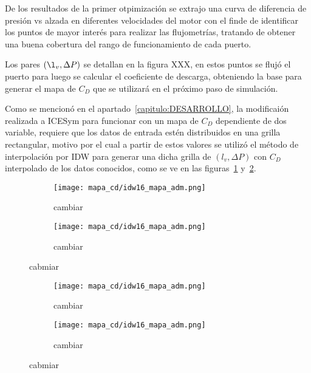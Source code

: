 De los resultados de la primer otpimización se extrajo una curva de diferencia
de presión vs alzada en diferentes velocidades del motor con el finde de
identificar los puntos de mayor interés para realizar las flujometrías,
tratando de obtener una buena cobertura del rango de funcionamiento de cada
puerto.


Los pares $(\l_{v}, \Delta P)$ se detallan en la figura XXX, en estos puntos se
flujó el puerto para luego se calcular el coeficiente de descarga, obteniendo
la base para generar el mapa de $C_D$ que se utilizará en el próximo paso de
simulación.

Como se mencionó en el apartado~\ref{capitulo:DESARROLLO}, la modificaión
realizada a ICESym para funcionar con un mapa de $C_{D}$ dependiente de dos
variable, requiere que los datos de entrada estén distribuidos en una grilla
rectangular, motivo por el cual a partir de estos valores se utilizó el método
de interpolación por IDW para generar una dicha grilla de $(l_{v}, \Delta P)$
con $C_{D}$ interpolado de los datos conocidos, como se ve en las
figuras~\ref{fig:mapa_cd_admision} y~\ref{fig:mapa_cd_escape}.

\begin{figure}
    \centering
    \begin{subfigure}{0.4\textwidth}
        \centering
        \texttt{[image: mapa\_cd/idw16\_mapa\_adm.png]}
        \caption{cambiar}
    \end{subfigure}
    \hfill
    \begin{subfigure}{0.4\textwidth}
        \centering
        \texttt{[image: mapa\_cd/idw16\_mapa\_adm.png]}
        \caption{cambiar}
    \end{subfigure}
    \caption{cabmiar}\label{fig:mapa_cd_admision}
\end{figure}

\begin{figure}
    \centering
    \begin{subfigure}{0.4\textwidth}
        \centering
        \texttt{[image: mapa\_cd/idw16\_mapa\_adm.png]}
        \caption{cambiar}
    \end{subfigure}
    \hfill
    \begin{subfigure}{0.4\textwidth}
        \centering
        \texttt{[image: mapa\_cd/idw16\_mapa\_adm.png]}
        \caption{cambiar}
    \end{subfigure}
    \caption{cabmiar}\label{fig:mapa_cd_escape}
\end{figure}

